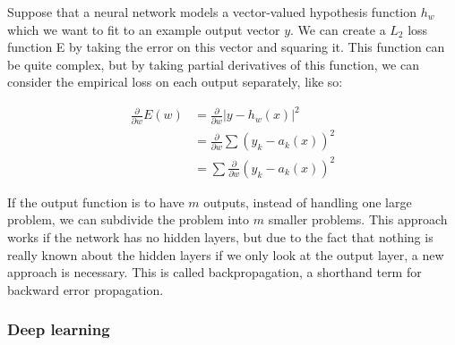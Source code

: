 Suppose that a neural network models a vector-valued hypothesis
function $h_w$ which we want to fit to an example output vector
$y$. We can create a $L_2$ loss function E by taking the error on this
vector and squaring it. This function can be quite complex, but by
taking partial derivatives of this function, we can consider the
empirical loss on each output separately, like so:

\begin{equation}
  \begin{align} 
    \frac{\partial}{\partial w} E(w) &= \frac{\partial}{\partial w} \lvert y - h_w(x) \rvert^2 \\
    &= \frac{\partial}{\partial w} \sum (y_k - a_k(x))^2 \\
    &=  \sum \frac{\partial}{\partial w} (y_k - a_k(x))^2
  \end{align} 
\end{equation}

If the output function is to have $m$ outputs, instead of handling one
large problem, we can subdivide the problem into $m$ smaller
problems. This approach works if the network has no hidden layers, but
due to the fact that nothing is really known about the hidden layers
if we only look at the output layer, a new approach is necessary. This
is called backpropagation, a shorthand term for backward error
propagation.

\subsubsection{Deep learning}
\label{sec:neuralnetworks}



